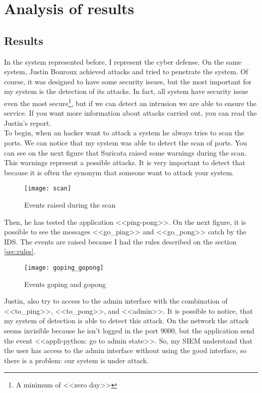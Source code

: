 
\chapter{Analysis of results}
\label{chap:analysis}


\section{Results}

In the system represented before, I represent the cyber defense. On the same system, Justin Bouroux achieved
attacks and tried to penetrate the system. Of course, it was designed to have some security issues, but the most
important for my system is the detection of its attacks. In fact, all system have security issue even the most
secure\footnote{A minimum of <<zero day>>}, but if we can detect an intrusion we are able to ensure the service. If
you want more information about attacks carried out, you can read the Justin's report.
~\\

To begin, when an hacker want to attack a system he always tries to scan the ports. We can notice that my system
was able to detect the scan of ports. You can see on the next figure that Suricata raised some warnings during the
scan. This warnings represent a possible attacks. It is very important to detect that because it is often the
synonym that someone want to attack your system.

\begin{figure}[h]
  \centering
  \texttt{[image: scan]}
  \caption{Events raised during the scan}
  \label{fig:scan}
\end{figure}



Then, he has tested the application <<ping-pong>>. On the next figure, it is possible to see the messages
<<go\_ping>> and <<go\_pong>> catch by the IDS. The events are raised because I had the rules described on the
section \ref{sec:rules}.

\begin{figure}[h]
  \centering
  \texttt{[image: goping\_gopong]}
  \caption{Events goping and gopong}
  \label{fig:gopong}
\end{figure}


Justin, also try to access to the admin interface with the combination of <<to\_ping>>, <<to\_pong>>, and
<<admin>>. It is possible to notice, that my system of detection is able to detect this attack. On the network the
attack seems invisible because he isn't logged in the port 9000, but the application send the event <<appli-python:
go to admin state>>. So, my SIEM understand that the user has access to the admin interface without using the good
interface, so there is a problem: our system is under attack.

